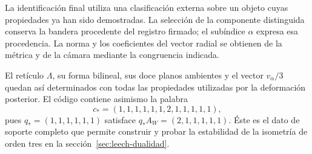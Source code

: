 La identificación final utiliza una clasificación
externa sobre un objeto cuyas propiedades ya han
sido demostradas. La selección de la componente
distinguida conserva la bandera procedente del
registro firmado; el subíndice \(\alpha\) expresa
esa procedencia. La norma y los coeficientes del
vector radial se obtienen de la métrica y de
la cámara mediante la congruencia indicada.

El retículo \(\Lambda\), su forma bilineal, sus
doce planos ambientes y el vector \(v_\alpha/3\)
quedan así determinados con todas las propiedades
utilizadas por la deformación posterior. El
código contiene asimismo la palabra
\[
 c_*=(1,1,1,1,1,1,2,1,1,1,1,1),
\]
pues \(q_*=(1,1,1,1,1,1)\) satisface
\(q_*A_W=(2,1,1,1,1,1)\). Éste es el dato
de soporte completo que permite construir y
probar la estabilidad de la isometría de orden
tres en la sección~\ref{sec:leech-dualidad}.

